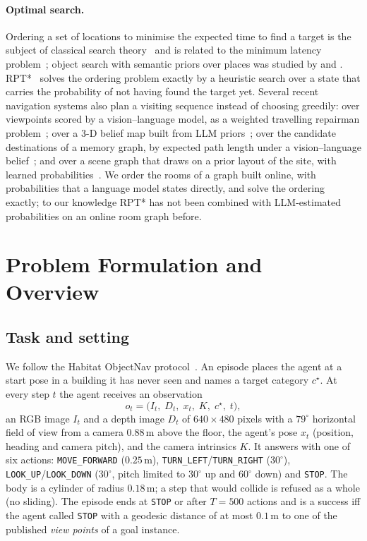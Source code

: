 \documentclass[10pt]{article}
\newcommand{\code}[1]{\texttt{#1}}
\newcommand{\m}{\,\mathrm{m}}
\newcommand{\degree}{^{\circ}}
\newcommand{\cstar}{c^{\star}}              %
\begin{document}
\paragraph{Optimal search.} Ordering a set of locations to minimise the
expected time to find a target is the subject of classical search
theory~\citep{stone1975theory} and is related to the minimum latency
problem~\citep{blum1994minimum}; object search with semantic priors over places
was studied by \citet{kollar2009utilizing} and \citet{aydemir2013active}.
RPT*~\citep{lyu2026rpt} solves the ordering problem exactly by a heuristic
search over a state that carries the probability of not having found the
target yet. Several recent navigation systems also plan a visiting sequence
instead of choosing greedily: over viewpoints scored by a vision--language
model, as a weighted travelling repairman problem~\citep{liu2025handle}; over
a 3-D belief map built from LLM priors~\citep{zhou2025beliefmapnav}; over the
candidate destinations of a memory graph, by expected path length under a
vision--language belief~\citep{niu2026ssmg}; and over a scene graph that draws
on a prior layout of the site, with learned
probabilities~\citep{ginting2024seek}. We order the rooms of a graph built
online, with probabilities that a language model states directly, and solve
the ordering exactly; to our knowledge RPT* has not been combined with
LLM-estimated probabilities on an online room graph before.

\section{Problem Formulation and Overview}\label{sec:problem}

\subsection{Task and setting}\label{sec:task}
We follow the Habitat ObjectNav protocol~\citep{batra2020objectnav}. An episode
places the agent at a start pose in a building it has never seen and names a
target category $\cstar$. At every step $t$ the agent receives an observation
\[
  o_t = \bigl(I_t,\; D_t,\; x_t,\; K,\; \cstar,\; t\bigr),
\]
an RGB image $I_t$ and a depth image $D_t$ of $640\times480$ pixels with a
$79\degree$ horizontal field of view from a camera $0.88\m$ above the floor,
the agent's pose $x_t$ (position, heading and camera pitch), and the camera
intrinsics $K$. It answers with one of six actions: \code{MOVE\_FORWARD}
($0.25\m$), \code{TURN\_LEFT}/\code{TURN\_RIGHT} ($30\degree$),
\code{LOOK\_UP}/\code{LOOK\_DOWN} ($30\degree$, pitch limited to $30\degree$ up
and $60\degree$ down) and \code{STOP}. The body is a cylinder of radius
$0.18\m$; a step that would collide is refused as a whole (no sliding). The
episode ends at \code{STOP} or after $T=500$ actions and is a success iff the
agent called \code{STOP} with a geodesic distance of at most $0.1\m$ to one of
the published \emph{view points} of a goal instance.
\end{document}
